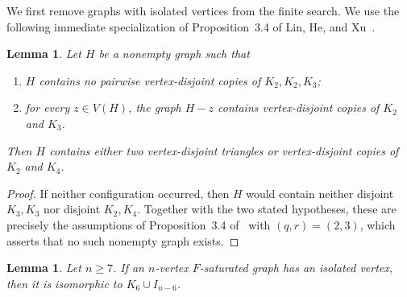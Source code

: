 \documentclass[11pt]{amsart}
\newtheorem{lemma}[theorem]{Lemma}
\begin{document}
We first remove graphs with isolated vertices from the finite search. We use the
following immediate specialization of Proposition~3.4 of Lin, He, and
Xu~\cite{LinHeXu}.

\begin{lemma}\label{lem:dichotomy}
Let $H$ be a nonempty graph such that
\begin{enumerate}
\item $H$ contains no pairwise vertex-disjoint copies of $K_2,K_2,K_3$;
\item for every $z\in V(H)$, the graph $H-z$ contains vertex-disjoint copies of
$K_2$ and $K_3$.
\end{enumerate}
Then $H$ contains either two vertex-disjoint triangles or vertex-disjoint copies
of $K_2$ and $K_4$.
\end{lemma}

\begin{proof}
If neither configuration occurred, then $H$ would contain neither disjoint
$K_3,K_3$ nor disjoint $K_2,K_4$. Together with the two stated hypotheses,
these are precisely the assumptions of Proposition~3.4 of~\cite{LinHeXu} with
$(q,r)=(2,3)$, which asserts that no such nonempty graph exists.
\end{proof}

\begin{lemma}\label{lem:isolate}
Let $n\ge7$. If an $n$-vertex $F$-saturated graph has an isolated vertex, then
it is isomorphic to $K_6\cup I_{n-6}$.
\end{lemma}
\end{document}
